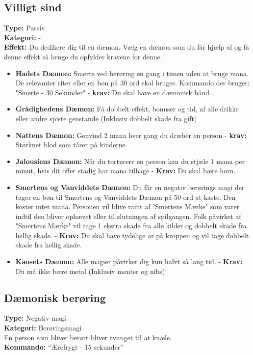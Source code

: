 \subsection{Villigt sind}
\textbf{Type:} Passiv\\
\textbf{Kategori:} -\\
    \textbf{Effekt:} Du dedikere dig til en dæmon. Vælg en dæmon som du får hjælp af og få denne effekt så længe du opfylder kravene for denne.
        \begin{itemize}
            \item \textbf{Hadets Dæmon:} Smerte ved berøring en gang i timen uden at bruge mana. De relevanter riter eller en bøn på 30 ord skal bruges. Kommando der bruger: "Smerte - 30 Sekunder" - \textbf{krav:} Du skal have en dæmonisk hånd.
            \item \textbf{Grådighedens Dæmon:} Få dobbelt effekt, bonuser og tid, af alle drikke eller andre spiste genstande (Inklusiv dobbelt skade fra gift)
            \item \textbf{Nattens Dæmon:} Genvind 2 mana hver gang du dræber en person - \textbf{krav:} Størknet blod som tårer på kinderne.
            \item \textbf{Jalousiens Dæmon:} Når du torturere en person kan du stjæle 1 mana per minut, hvis dit offer stadig har mana tilbage - \textbf{Krav:} Du skal bære horn.
            \item \textbf{Smertens og Vanviddets Dæmon:} Du får en negativ berørings magi der tager en bøn til Smertens og Vanviddets Dæmon på 50 ord at kaste. Den koster intet mana. Personen vil blive ramt af "Smertens Mærke" som varer indtil den bliver ophævet eller til slutningen af spilgangen. Folk påvirket af "Smertens Mærke" vil tage 1 ekstra skade fra alle kilder og dobbelt skade fra hellig skade. - \textbf{Krav:} Du skal have tydelige ar på kroppen og vil tage dobbelt skade fra hellig skade.
            \item \textbf{Kaosets Dæmon:} Alle magier påvirker dig kun halvt så lang tid. - \textbf{Krav:} Du må ikke bære metal (Inklusiv mønter og nibs)
        \end{itemize}

\subsection{Dæmonisk berøring}
\textbf{Type:} Negativ magi\\
\textbf{Kategori:} Berøringsmagi\\
En person som bliver berørt bliver tvunget til at knæle.\\
\textbf{Kommando:} “Ærefrygt - 15 sekunder”

